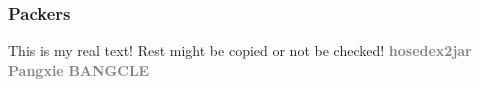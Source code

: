 \subsubsection{Packers}\label{subsubsection:counter-reengineering-propack-packers}
This is my real text! Rest might be copied or not be checked!
\newline\newline\textbf{\textcolor{gray}{hosedex2jar}}\newline
\newline\newline\textbf{\textcolor{gray}{Pangxie}}\newline
\newline\newline\textbf{\textcolor{gray}{BANGCLE}}\newline

